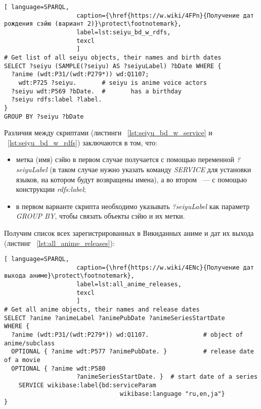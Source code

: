 \begin{lstlisting}[ language=SPARQL, 
                    caption={\href{https://w.wiki/4FPn}{Получение дат рождения сэйю (вариант 2)}\protect\footnotemark},
                    label=lst:seiyu_bd_w_rdfs,
                    texcl 
                    ]
# Get list of all seiyu objects, their names and birth dates
SELECT ?seiyu (SAMPLE(?seiyu) AS ?seiyuLabel) ?bDate WHERE {
  ?anime (wdt:P31/(wdt:P279*)) wd:Q1107;
    wdt:P725 ?seiyu.       # seiyu is anime voice actors
  ?seiyu wdt:P569 ?bDate.  #       has a birthday 
  ?seiyu rdfs:label ?label.
}
GROUP BY ?seiyu ?bDate
\end{lstlisting}%

Различия между скриптами (листинги  ~\protect\ref{lst:seiyu_bd_w_service} и  ~\protect\ref{lst:seiyu_bd_w_rdfs}) заключаются в том, что:

\begin{itemize}
    \item метка (имя) сэйю в первом случае получается с помощью переменной \emph{?seiyuLabel} (в таком случае нужно указать команду \emph{SERVICE} для установки языков, на котором будут возвращены имена), а во втором ~--- с помощью конструкции \emph{rdfs:label};
    \item в первом варианте скрипта необходимо указывать \emph{?seiyuLabel} как параметр \emph{GROUP BY}, чтобы связать объекты сэйю и их метки.
\end{itemize}

Получим список всех зарегистрированных в Викиданных аниме и дат их выхода (листинг ~\protect\ref{lst:all_anime_releases}): 

\begin{lstlisting}[ language=SPARQL, 
                    caption={\href{https://w.wiki/4ENc}{Получение дат выхода аниме}\protect\footnotemark},
                    label=lst:all_anime_releases,
                    texcl 
                    ]
# Get all anime objects, their names and release dates
SELECT ?anime ?animeLabel ?animePubDate ?animeSeriesStartDate
WHERE {
  ?anime (wdt:P31/(wdt:P279*)) wd:Q1107.               # object of anime/subclass
  OPTIONAL { ?anime wdt:P577 ?animePubDate. }          # release date of a movie
  OPTIONAL { ?anime wdt:P580
					?animeSeriesStartDate. }  # start date of a series
    SERVICE wikibase:label{bd:serviceParam
					     		wikibase:language "ru,en,ja"}
}
\end{lstlisting}%

